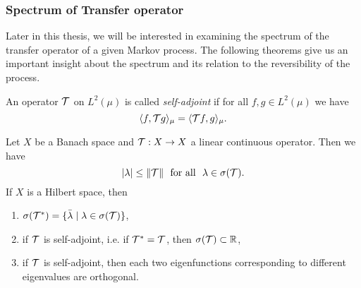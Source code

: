 \subsubsection*{Spectrum of Transfer operator}

Later in this thesis, we will be interested in examining the spectrum of the transfer operator of a given Markov process.
The following theorems give us an important insight about the spectrum and its relation to the reversibility of the process.

\begin{defi}
An operator $\mathcal{T}$ on $L^2(\mu)$ is called \textit{self-adjoint} if for all $f,g \in L^2(\mu)$ we have
\begin{equation*}
\langle f, \mathcal{T} g \rangle_\mu = \langle \mathcal{T} f, g \rangle_\mu.
\end{equation*}
\end{defi}

\begin{thm}
\label{thm:spectrum_operator}
Let $X$ be a Banach space and $\mathcal{T}: X \rightarrow X$ a linear continuous operator. Then we have
\begin{equation*}
| \lambda | \leq \Vert \mathcal{T} \Vert \ \textrm{ for all } \ \lambda \in \sigma(\mathcal{T}).
\end{equation*}
If $X$ is a Hilbert space, then
\begin{enumerate}
\item $\sigma(\mathcal{T}^{*}) = \{ \bar{\lambda} \mid \lambda \in \sigma(\mathcal{T})\}$,
\item if $\mathcal{T}$ is self-adjoint, i.e. if $\mathcal{T}^{*} = \mathcal{T}$, then $\sigma(\mathcal{T}) \subset \mathbb{R}$,
\item if $\mathcal{T}$ is self-adjoint, then each two eigenfunctions corresponding to different eigenvalues are orthogonal.
\end{enumerate}
\end{thm}

